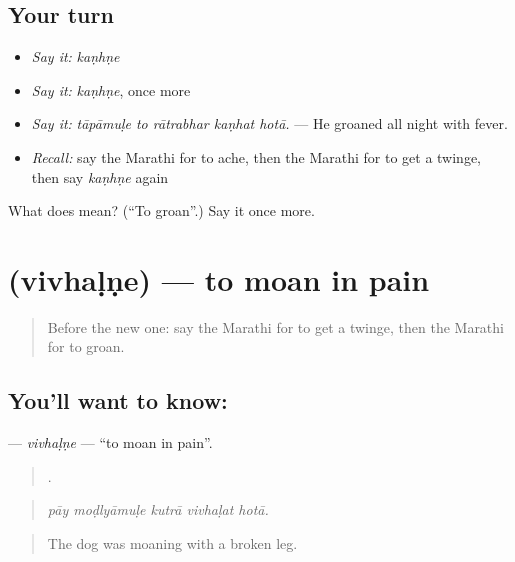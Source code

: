 \subsection*{Your turn}
\begin{itemize}
\raggedright
  \item \emph{Say it:} \emph{kaṇhṇe}
  \item \emph{Say it:} \emph{kaṇhṇe}, once more
  \item \emph{Say it:} \emph{tāpāmuḷe to rātrabhar kaṇhat hotā.} — He groaned all night with fever.
  \item \emph{Recall:} say the Marathi for to ache, then the Marathi for to get a twinge, then say \emph{kaṇhṇe} again
\end{itemize}

\begin{tcolorbox}[breakable,colback=teal!4,colframe=teal!35!black,title={Before you move on}]
What does  mean? (\textquotedblleft{}To groan\textquotedblright{}.) Say it once more.
\end{tcolorbox}
\section[\texorpdfstring{\mr{विव्हळणे} (vivhaḷṇe)}{विव्हळणे (vivhaḷṇe)}]{ (vivhaḷṇe) — to moan in pain}

\label{lesson:MR-C482-vivhalne}



\begin{quote}
Before the new one: say the Marathi for to get a twinge, then the Marathi for to groan.
\end{quote}

\subsection*{You'll want to know: }
\textbf{} — \emph{vivhaḷṇe} — \textquotedblleft{}to moan in pain\textquotedblright{}.

\begin{quote}
    .
\end{quote}

\begin{quote}
\emph{pāy moḍlyāmuḷe kutrā vivhaḷat hotā.}
\end{quote}

\begin{quote}
The dog was moaning with a broken leg.
\end{quote}

